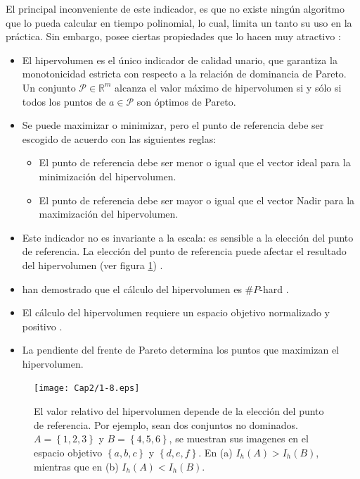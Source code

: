   El principal inconveniente de este indicador, es que no existe ning\'un algoritmo que lo pueda calcular en tiempo polinomial, 
  lo cual, limita un tanto su uso en la pr\'actica. Sin embargo, posee ciertas propiedades que lo hacen muy atractivo \cite{Cynthia01}:
  
  \begin{itemize}
   \item El hipervolumen es el \'unico indicador de calidad unario, que garantiza la monotonicidad estricta 
   con respecto a la relaci\'on de dominancia de Pareto. Un conjunto $\mathcal{P} \in\mathbb{R}^m $ alcanza el valor m\'aximo 
   de hipervolumen si y s\'olo si todos los puntos de $a \in \mathcal{P}$ son \'optimos de Pareto.
   \item Se puede maximizar o minimizar, pero el punto de referencia debe ser escogido de acuerdo con las siguientes reglas:
   \begin{itemize}
    \item El punto de referencia debe ser menor o igual que el vector ideal para la minimizaci\'on del hipervolumen.
    \item El punto de referencia debe ser mayor o igual que el vector Nadir para la maximizaci\'on del hipervolumen.
   \end{itemize}
    \item Este indicador no es invariante a la escala: es sensible a la elecci\'on del punto de referencia. 
    La elecci\'on del punto de referencia puede afectar el resultado del hipervolumen  (ver figura \ref{fig:hipevolref}) 
    \cite{Edgar01}.
  \item \cite{BringmannF08} han demostrado que el c\'alculo del hipervolumen es $\#P$-hard .
   \item El c\'alculo del hipervolumen requiere un espacio objetivo normalizado y positivo \cite{Emmerich05anemo}.
   \item La pendiente del frente de Pareto determina los puntos que maximizan el hipervolumen.
  \end{itemize}
   
    \begin{figure}
	\centering
	\texttt{[image: Cap2/1-8.eps]}
	  \caption [Elecci\'on del Punto de Referencia]{
	  El valor relativo del hipervolumen depende de la elecci\'on del punto de  referencia. Por ejemplo,
	  sean dos conjuntos no dominados. $A = \left\{1, 2, 3\right\}$ y $B = \left\{4, 5, 6\right\}$, 
	  se muestran sus imagenes en el espacio objetivo $\left\{a, b, c\right\}$ y $\left\{d, e, f\right\}$.
	  En (a) $I_h\left(A\right) > I_h \left(B\right)$, mientras que en (b) $I_h\left(A\right) < I_h\left( B\right)$.}
      \label{fig:hipevolref}
      \end{figure}
   
